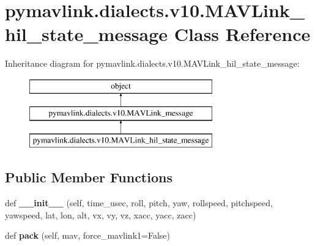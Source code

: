 \hypertarget{classpymavlink_1_1dialects_1_1v10_1_1MAVLink__hil__state__message}{}\section{pymavlink.\+dialects.\+v10.\+M\+A\+V\+Link\+\_\+hil\+\_\+state\+\_\+message Class Reference}
\label{classpymavlink_1_1dialects_1_1v10_1_1MAVLink__hil__state__message}
Inheritance diagram for pymavlink.\+dialects.\+v10.\+M\+A\+V\+Link\+\_\+hil\+\_\+state\+\_\+message\+:\begin{figure}[H]
\begin{center}
\leavevmode
\includegraphics[height=3.000000cm]{classpymavlink_1_1dialects_1_1v10_1_1MAVLink__hil__state__message}
\end{center}
\end{figure}
\subsection*{Public Member Functions}
\begin{DoxyCompactItemize}
\item 
\mbox{\label{classpymavlink_1_1dialects_1_1v10_1_1MAVLink__hil__state__message_ab1a7f7cd1d3fd643c01a8a992377db23}} 
def {\bfseries \+\_\+\+\_\+init\+\_\+\+\_\+} (self, time\+\_\+usec, roll, pitch, yaw, rollspeed, pitchspeed, yawspeed, lat, lon, alt, vx, vy, vz, xacc, yacc, zacc)
\item 
\mbox{\label{classpymavlink_1_1dialects_1_1v10_1_1MAVLink__hil__state__message_ab187fc760fe26669b3dd7ad5beacd7f6}} 
def {\bfseries pack} (self, mav, force\+\_\+mavlink1=False)
\end{DoxyCompactItemize}
